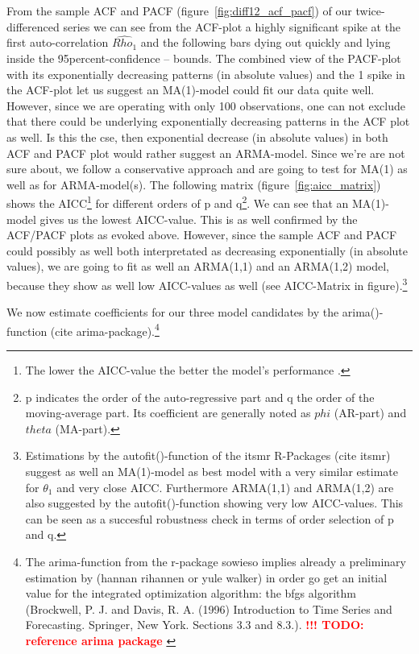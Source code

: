 \documentclass[11pt,a4paper]{article}
\newcommand{\TODO}[1]{%
    \textcolor{red}{%
        \textbf{!!! TODO: #1}%
    }%
    \PackageWarning{TODO:}{TODO: #1}%
}
\begin{document}
From the sample ACF and PACF (figure~\ref{fig:diff12_acf_pacf}) of our twice-differenced series we can see from the ACF-plot a highly significant spike at the first auto-correlation $\hat{Rho_1}$ and the following bars dying out quickly and lying inside the 95percent-confidence – bounds.
The combined view of the PACF-plot with its exponentially decreasing patterns (in absolute values) and the 1 spike in the ACF-plot let us suggest an MA(1)-model could fit our data quite well.
However, since we are operating with only 100 observations, one can not exclude that there could be underlying exponentially decreasing patterns in the ACF plot as well.
Is this the cse, then exponential decrease (in absolute values) in both ACF and PACF plot would rather suggest an ARMA-model.
Since  we’re are not sure about, we follow a conservative approach and are going to test for MA(1) as well as for ARMA-model(s).
The following matrix (figure~\ref{fig:aicc_matrix}) shows the AICC\footnote{
    The lower the AICC-value the better the model's performance \citep{aic86}.
} for different orders of p and q\footnote{
    p indicates the order of the auto-regressive part and q the order of the moving-average part.
    Its coefficient are generally noted as $phi$ (AR-part) and $theta$ (MA-part).
}.
We can see that an MA(1)-model gives us the lowest AICC-value.
This is as well confirmed by the ACF/PACF plots as evoked above.
However, since the sample ACF and PACF could possibly as well both interpretated as decreasing exponentially (in absolute values), we are going to fit as well an ARMA(1,1) and an ARMA(1,2) model, because they show as well low AICC-values as well (see AICC-Matrix in figure).\footnote{
    Estimations by the autofit()-function of the itsmr R-Packages (cite itsmr) suggest as well an MA(1)-model as best model with a very similar estimate for $\theta_1$ and very close AICC.
    Furthermore ARMA(1,1) and ARMA(1,2) are also suggested by the autofit()-function showing very low AICC-values.
    This can be seen as a succesful robustness check in terms of order selection of p and q.
}

We now estimate coefficients for our three model candidates by the arima()-function (cite arima-package).\footnote{
    The arima-function from the r-package sowieso implies already a preliminary estimation by (hannan rihannen or yule walker) in order go get an initial value for the integrated optimization algorithm:
    the bfgs algorithm (Brockwell, P. J. and Davis, R. A. (1996) Introduction to Time Series and Forecasting. Springer, New York. Sections 3.3 and 8.3.).
    \TODO{reference arima package}
}
\end{document}
